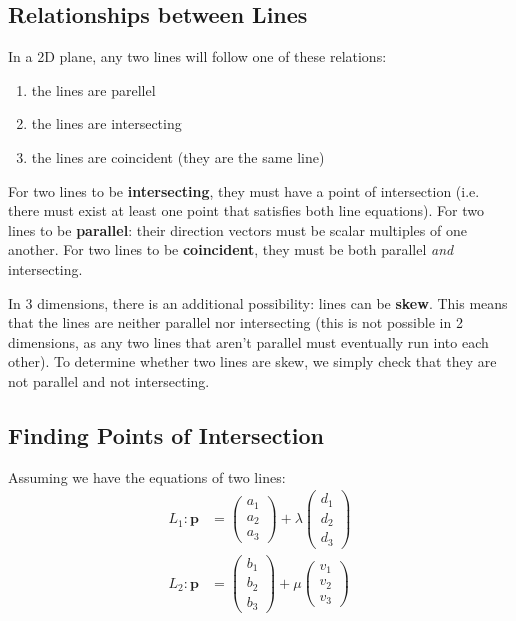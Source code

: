 \documentclass[
	11pt, %
	fleqn, %
	a4paper, %
]{../../styles/LegrandOrangeBook}
\begin{document}

\subsection{Relationships between Lines}

In a 2D plane, any two lines will follow one of these relations:

\begin{enumerate}[label=(\alph*)]
	\item the lines are parellel
	\item the lines are intersecting
	\item the lines are coincident (they are the same line)
\end{enumerate}


For two lines to be \textbf{intersecting}, they must have a point of intersection (i.e. there must exist at least one point that satisfies both line equations). For two lines to be \textbf{parallel}: their direction vectors must be scalar multiples of one another.  For two lines to be \textbf{coincident}, they must be both parallel \textit{and} intersecting.

In 3 dimensions, there is an additional possibility: lines can be \textbf{skew}. This means that the lines are neither parallel nor intersecting (this is not possible in 2 dimensions, as any two lines that aren't parallel must eventually run into each other). To determine whether two lines are skew, we simply check that they are not parallel and not intersecting.

\subsection{Finding Points of Intersection}

Assuming we have the equations of two lines:
\begin{align*}
	L_1: \mathbf{p} &= \begin{pmatrix}
		a_1 \\ a_2 \\ a_3
	\end{pmatrix} + \lambda \begin{pmatrix}
		d_1 \\ d_2 \\ d_3
	\end{pmatrix} \\
	L_2: \mathbf{p} &= \begin{pmatrix}
		b_1 \\ b_2 \\ b_3
	\end{pmatrix} + \mu \begin{pmatrix}
		v_1 \\ v_2 \\ v_3
	\end{pmatrix}
\end{align*}
\end{document}
